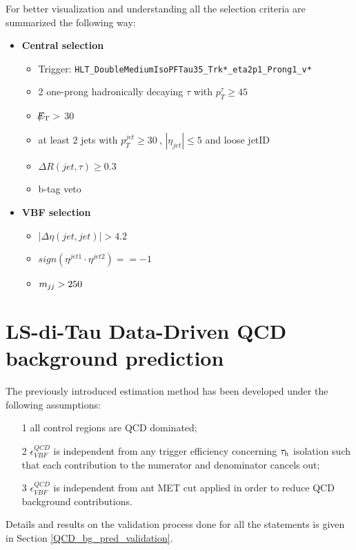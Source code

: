 For better visualization and understanding all the selection criteria are summarized the following way:

\begin{itemize}
	\item \textbf{Central selection}
	\begin{itemize}
		\item Trigger: \texttt{HLT\_DoubleMediumIsoPFTau35\_Trk*\_eta2p1\_Prong1\_v*}
		\item 2 one-prong hadronically decaying $\tau$ with $p_{T}^{\tau}\geq45~$\gev 
		\item $\slash\mkern-12mu{E}_{\text{T}} > $ 30
		\item at least 2 jets with $p_{T}^{jet}\geq30~$\gev, $|\eta_{jet}|\leq5$ and loose jetID
		\item $\Delta R(jet,\tau)\geq0.3$
		\item b-tag veto
	\end{itemize}
	\item \textbf{VBF selection}
	\begin{itemize}
		\item $|\Delta\eta(jet,jet)| > 4.2$
		\item $sign(\eta^{jet 1}\cdot\eta^{jet 2})==-1$
		\item $m_{jj}>250~$\gev
	\end{itemize}
\end{itemize}

\clearpage

\section {LS-di-Tau Data-Driven QCD background prediction} \label{sec:bgestimation}

The previously introduced estimation method has been developed under the following assumptions:
\begin{itemize}
	\item[1] all control regions are QCD dominated;
	\item[2] $\epsilon^{QCD}_{VBF}$ is independent from any trigger efficiency concerning $\tau_{\text{h}}$ isolation such that each contribution to the numerator and denominator cancels out;
	\item[3] $\epsilon^{QCD}_{VBF}$ is independent from ant MET cut applied in order to reduce QCD background contributions. 
\end{itemize}

Details and results on the validation process done for all the statements is given in Section \ref{QCD_bg_pred_validation}.

